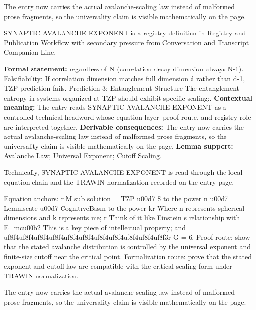 The entry now carries the actual avalanche-scaling law instead of malformed prose fragments, so the universality claim is visible mathematically on the page.
\clearpage


\begingroup\small
{}
SYNAPTIC AVALANCHE EXPONENT is a registry definition in Registry and Publication Workflow with secondary pressure from Conversation and Transcript Companion Line.

\begingroup\footnotesize\setlength{\emergencystretch}{3em}\sloppy
\textbf{Formal statement:} regardless of N (correlation decay dimension always N-1). Falsifiability: If correlation dimension matches full dimension d rather than d-1, TZP prediction fails. Prediction 3: Entanglement Structure The entanglement entropy in systems organized at TZP should exhibit specific scaling:. \textbf{Contextual meaning:} The entry reads SYNAPTIC AVALANCHE EXPONENT as a controlled technical headword whose equation layer, proof route, and registry role are interpreted together. \textbf{Derivable consequences:} The entry now carries the actual avalanche-scaling law instead of malformed prose fragments, so the universality claim is visible mathematically on the page. \textbf{Lemma support:} Avalanche Law; Universal Exponent; Cutoff Scaling.\par
\endgroup

Technically, SYNAPTIC AVALANCHE EXPONENT is read through the local equation chain and the TRAWIN normalization recorded on the entry page.

Equation anchors: r M sub solution = TZP u00d7 S to the power n u00d7 Lemniscate u00d7 CognitiveBasin to the power kr Where n represents spherical dimensions and k represents me; r Think of it like Einstein s relationship with E=mcu00b2 This is a key piece of intellectual property; and uf8f4uf8f4uf8f4uf8f4uf8f4uf8f4uf8f4uf8f4uf8f4uf8f4uf8f3r G = 6. Proof route: show that the stated avalanche distribution is controlled by the universal exponent and finite-size cutoff near the critical point. Formalization route: prove that the stated exponent and cutoff law are compatible with the critical scaling form under TRAWIN normalization.

The entry now carries the actual avalanche-scaling law instead of malformed prose fragments, so the universality claim is visible mathematically on the page.
\endgroup

